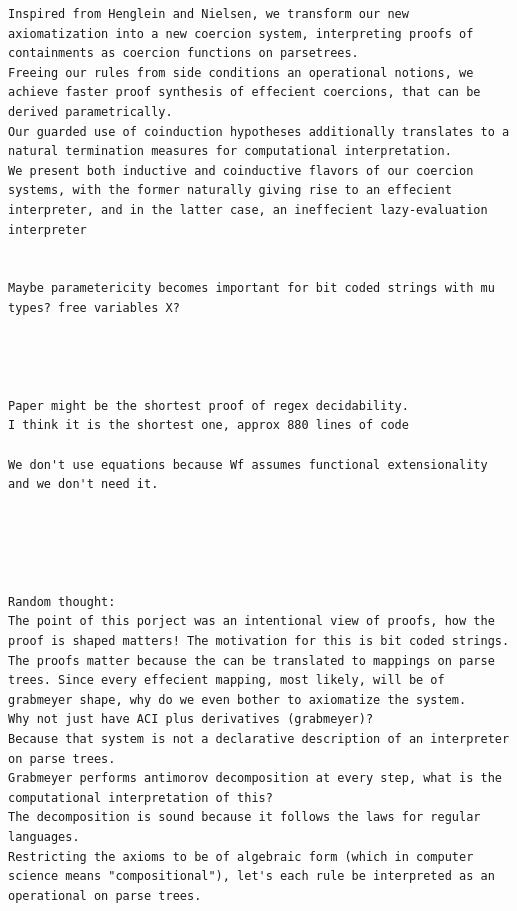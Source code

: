 \documentclass[a4paper,UKenglish,cleveref, autoref, thm-restate]{lipics-v2021}
\begin{document}
\begin{verbatim}
Inspired from Henglein and Nielsen, we transform our new axiomatization into a new coercion system, interpreting proofs of containments as coercion functions on parsetrees. 
Freeing our rules from side conditions an operational notions, we achieve faster proof synthesis of effecient coercions, that can be derived parametrically.
Our guarded use of coinduction hypotheses additionally translates to a natural termination measures for computational interpretation.
We present both inductive and coinductive flavors of our coercion systems, with the former naturally giving rise to an effecient interpreter, and in the latter case, an ineffecient lazy-evaluation interpreter


Maybe parametericity becomes important for bit coded strings with mu types? free variables X?




Paper might be the shortest proof of regex decidability.
I think it is the shortest one, approx 880 lines of code

We don't use equations because Wf assumes functional extensionality and we don't need it.





Random thought:
The point of this porject was an intentional view of proofs, how the proof is shaped matters! The motivation for this is bit coded strings.
The proofs matter because the can be translated to mappings on parse trees. Since every effecient mapping, most likely, will be of grabmeyer shape, why do we even bother to axiomatize the system.
Why not just have ACI plus derivatives (grabmeyer)? 
Because that system is not a declarative description of an interpreter on parse trees. 
Grabmeyer performs antimorov decomposition at every step, what is the computational interpretation of this?
The decomposition is sound because it follows the laws for regular languages. 
Restricting the axioms to be of algebraic form (which in computer science means "compositional"), let's each rule be interpreted as an operational on parse trees.
\end{verbatim}
\end{document}
